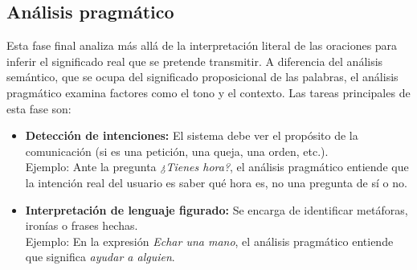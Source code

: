 \subsection{Análisis pragmático}

Esta fase final analiza más allá de la interpretación literal de las oraciones para inferir el significado real que se pretende transmitir. A diferencia del análisis semántico, que se ocupa del significado proposicional de las palabras, el análisis pragmático examina factores como el tono y el contexto. Las tareas principales de esta fase son:

\begin{itemize}
      \item \textbf{Detección de intenciones:} El sistema debe ver el propósito de la comunicación (si es una petición, una queja, una orden, etc.).
            \\
            Ejemplo: Ante la pregunta \textit{¿Tienes hora?}, el análisis pragmático entiende que la intención real del usuario es saber qué hora es, no una pregunta de sí o no.

      \item \textbf{Interpretación de lenguaje figurado:} Se encarga de identificar metáforas, ironías o frases hechas.
            \\
            Ejemplo: En la expresión \textit{Echar una mano}, el análisis pragmático entiende que significa \textit{ayudar a alguien}.
\end{itemize}

